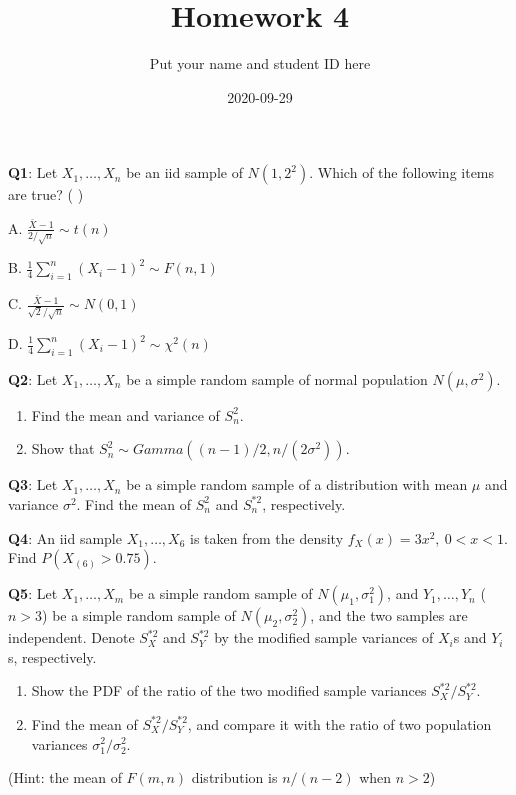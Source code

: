 \documentclass[]{article}
\title{Homework 4}
\author{Put your name and student ID here}
\date{2020-09-29}
\begin{document}
\maketitle

\textbf{Q1}: Let \(X_1,\dots,X_n\) be an iid sample of \(N(1,2^2)\).
Which of the following items are true? ( )

A. \(\frac{\bar X-1}{2/\sqrt{n}}\sim t(n)\)

B. \(\frac{1}{4}\sum_{i=1}^n(X_i-1)^2\sim F(n,1)\)

C. \(\frac{\bar X-1}{\sqrt{2}/\sqrt{n}}\sim N(0,1)\)

D. \(\frac{1}{4}\sum_{i=1}^n(X_i-1)^2\sim \chi^2(n)\)

\textbf{Q2}: Let \(X_1,\dots,X_n\) be a simple random sample of normal
population \(N(\mu,\sigma^2)\).

\begin{enumerate}
\def\labelenumi{\arabic{enumi}.}
\item
  Find the mean and variance of \(S_n^2\).
\item
  Show that \(S_n^2\sim Gamma((n-1)/2,n/(2\sigma^2))\).
\end{enumerate}

\textbf{Q3}: Let \(X_1,\dots,X_n\) be a simple random sample of a
distribution with mean \(\mu\) and variance \(\sigma^2\). Find the mean
of \(S_n^2\) and \(S_n^{*2}\), respectively.

\textbf{Q4}: An iid sample \(X_1,\dots,X_6\) is taken from the density
\(f_X(x)=3x^2,\ 0<x<1\). Find \(P(X_{(6)}>0.75)\).

\textbf{Q5}: Let \(X_1,\dots,X_m\) be a simple random sample of
\(N(\mu_1,\sigma_1^2)\), and \(Y_1,\dots,Y_n\) (\(n>3\)) be a simple
random sample of \(N(\mu_2,\sigma_2^2)\), and the two samples are
independent. Denote \(S_X^{*2}\) and \(S_Y^{*2}\) by the modified sample
variances of \(X_i\)s and \(Y_i\)s, respectively.

\begin{enumerate}
\def\labelenumi{\arabic{enumi}.}
\item
  Show the PDF of the ratio of the two modified sample variances
  \(S_X^{*2}/S_Y^{*2}\).
\item
  Find the mean of \(S_X^{*2}/S_Y^{*2}\), and compare it with the ratio
  of two population variances \(\sigma_1^2/\sigma_2^2\).
\end{enumerate}

(Hint: the mean of \(F(m,n)\) distribution is \(n/(n-2)\) when \(n>2\))
\end{document}
